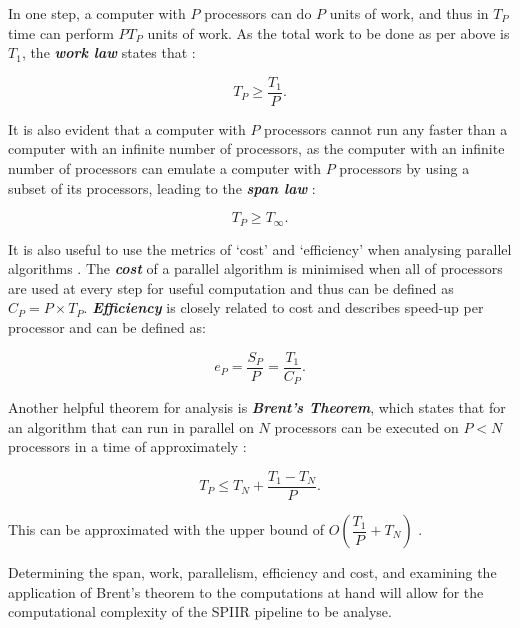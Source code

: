 \documentclass{article}
\begin{document}
In one step, a computer with \(P\) processors can do \(P\) units of work, and thus in \(T_P\) time can perform \(PT_P\) units of work.
As the total work to be done as per above is \(T_1\), the \textit{\textbf{work law}} states that \cite{CLRS_parallel}:

\begin{equation} \label{eq:work_law}
    T_P \geq \dfrac{T_1}{P}.
\end{equation}

It is also evident that a computer with \(P\) processors cannot run any faster than a computer with an infinite number of processors, as the computer with an infinite number of processors can emulate a computer with \(P\) processors by using a subset of its processors, leading to the \textit{\textbf{span law}} \cite{CLRS_parallel}:

\begin{equation} \label{eq:span_law}
    T_P \geq T_\infty.
\end{equation}

It is also useful to use the metrics of `cost' and `efficiency' when analysing parallel algorithms \cite{brent}.
The \textit{\textbf{cost}} of a parallel algorithm is minimised when all of processors are used at every step for useful computation and thus can be defined as \(C_P = P\times{T_P}\).
\textit{\textbf{Efficiency}} is closely related to cost and describes speed-up per processor and can be defined as:

\begin{equation} \label{eq:efficiency}
    e_P = \dfrac{S_P}{P} = \dfrac{T_1}{C_P}.
\end{equation}

Another helpful theorem for analysis is \textit{\textbf{Brent's Theorem}}, which states that for an algorithm that can run in parallel on \(N\) processors can be executed on \(P < N\) processors in a time of approximately \cite{BrentsLaw}:

\begin{equation} \label{eq:brents_law}
    T_P \leq T_N + \dfrac{T_1-T_N}{P}.
\end{equation}

This can be approximated with the upper bound of \(O(\dfrac{T_1}{P} + T_N)\) \cite{brent}.

Determining the span, work, parallelism, efficiency and cost, and examining the application of Brent's theorem to the computations at hand will allow for the computational complexity of the SPIIR pipeline to be analyse.
\end{document}
